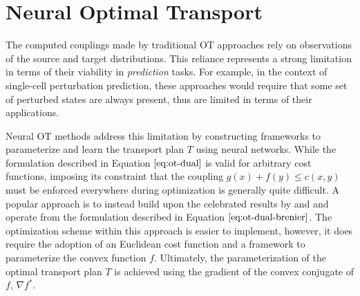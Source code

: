 \section{Neural Optimal Transport}
The computed couplings made by traditional OT approaches rely on observations of the source and target distributions.
This reliance represents a strong limitation in terms of their viability in \emph{prediction} tasks.
For example, in the context of single-cell perturbation prediction,
these approaches would require that some set of perturbed states are always present,
thus are limited in terms of their applications.

Neural OT methods address this limitation by constructing frameworks to parameterize and learn the transport plan $T$ using neural networks.
While the formulation described in Equation $\ref{eq:ot-dual}$ is valid for arbitrary cost functions,
imposing its constraint that the coupling $g(x) + f(y) \leq c(x, y)$ must be enforced everywhere during optimization is generally quite difficult.
A popular approach is to instead build upon the celebrated results by \citet{knott1984optimal} and \citet{brenier1991polar}
and operate from the formulation described in Equation $\ref{eq:ot-dual-brenier}$.
The optimization scheme within this approach is easier to implement, however, it does require
the adoption of an Euclidean cost function and a framework to parameterize the convex function $f$.
Ultimately, the parameterization of the optimal transport plan $T$ is achieved using the gradient of the convex conjugate of $f$, $\nabla f^*$.

